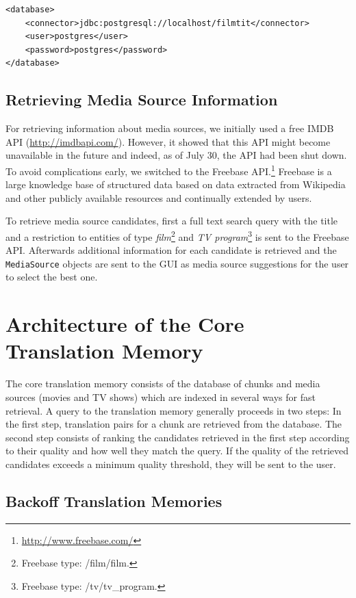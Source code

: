 \begin{lstlisting}
<database>
    <connector>jdbc:postgresql://localhost/filmtit</connector>
    <user>postgres</user>
    <password>postgres</password>
</database>
\end{lstlisting}


\subsection{Retrieving Media Source Information}

For retrieving information about media sources, we initially used a free IMDB API (\url{http://imdbapi.com/}). However, it showed that this API might become unavailable in the future and indeed, as of July 30, the API had been shut down. To avoid complications early, we switched to the Freebase API.\footnote{\url{http://www.freebase.com/}} Freebase is a large knowledge base of structured data based on data extracted from Wikipedia and other publicly available resources and continually extended by users.

To retrieve media source candidates, first a full text search query with the title and a restriction to entities of type \emph{film}\footnote{Freebase type: /film/film.} and \emph{TV program}\footnote{Freebase type: /tv/tv\_program.} is sent to the Freebase API. Afterwards additional information for each candidate is retrieved and the {\tt MediaSource} objects are sent to the GUI as media source suggestions for the user to select the best one.



\section{Architecture of the Core Translation Memory}
\label{sec:corearchitecture}

The core translation memory consists of the database of chunks and media
sources (movies and TV shows) which are indexed in several ways for fast
retrieval. A query to the translation memory generally proceeds in two
steps: In the first step, translation pairs for a chunk are retrieved from
the database. The second step consists of ranking the candidates
retrieved in the first step according to their quality and how well they
match the query. If the quality of the retrieved candidates exceeds a
minimum quality threshold, they will be sent to the user.

\subsection{Backoff Translation Memories}

